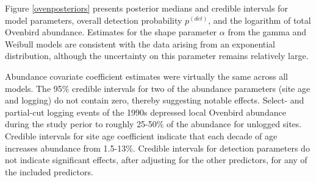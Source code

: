 \documentclass[12pt]{article}
\newcommand{\pdet}{p^{(det)}}
\begin{document}

Figure \ref{ovenposteriors} presents posterior medians and credible intervals for model parameters, overall detection probability $\pdet$, and the logarithm of total Ovenbird abundance.  
Estimates for the shape parameter $\alpha$ from the gamma and Weibull models are consistent with the data arising from an exponential distribution, although the uncertainty on this parameter remains relatively large. 

Abundance covariate coefficient estimates were virtually the same across all models.  
The 95\% credible intervals for two of the abundance parameters (site age and logging) do not contain zero, thereby suggesting notable effects.  
Select- and partial-cut logging events of the 1990s depressed local Ovenbird abundance during the study perior to roughly 25-50\% of the abundance for unlogged sites.  
Credible intervals for site age coefficient indicate that each decade of age increases abundance from 1.5-13\%.
Credible intervals for detection parameters do not indicate significant effects, after adjusting for the other predictors, for any of the included predictors.
\end{document}
